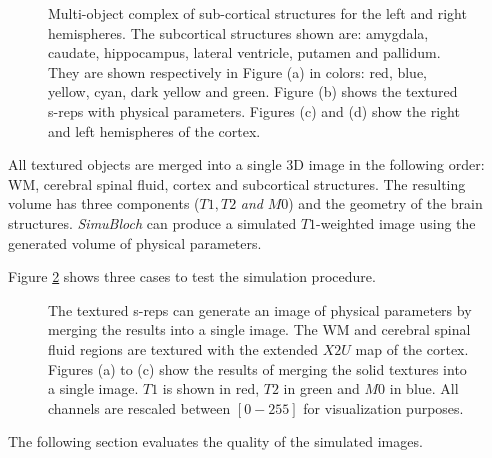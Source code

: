 \begin{figure} 
 \centering   
 \caption[Multi object subcortical]{Multi-object complex of sub-cortical structures for the left and right hemispheres. 
				    The subcortical structures shown are: amygdala, caudate, hippocampus, 
				    lateral ventricle, putamen and pallidum. 
				    They are shown respectively in Figure (a) in colors: red, blue, yellow, cyan, dark yellow and green. 
				    Figure (b) shows the textured s-reps with physical parameters.
				    Figures (c) and (d) show the right and left hemispheres of the cortex.}
 \label{fig:physicalParamsObjects}  
\end{figure}

All textured objects are merged into a single 3D image in the following order:
WM, cerebral spinal fluid, cortex and subcortical structures.
The resulting volume has three components ($T1, T2$ \textit{and} $M0$) and the geometry of the brain structures.
\textit{SimuBloch} can produce a simulated $T1$-weighted image using the generated volume of physical parameters.

Figure \ref{fig:physicalParamsObjectsImage} shows three cases to test the simulation procedure.
\begin{figure} 
 \centering   
\caption[Synthetic textured complex.]{The textured s-reps can generate an image of physical parameters by merging 
					the results into a single image.
					The WM and cerebral spinal fluid regions are textured 
					with the extended $X2U$ map of the cortex. Figures (a) to (c) show the results of merging 
					the solid textures into a single image. 
					$T1$ is shown in red, $T2$ in green and $M0$ in blue. 
					All channels are rescaled between $[0-255]$ for visualization purposes.
					}
 \label{fig:physicalParamsObjectsImage}  
\end{figure}
The following section evaluates the quality of the simulated images.

